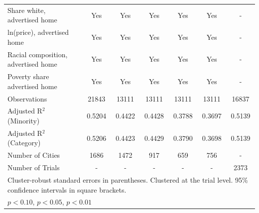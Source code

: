 \begin{table}[htbp]
{\begin{tabular}{l*{6}{c}}
\midrule
Share white, advertised home  & Yes & Yes & Yes & Yes & Yes & - \\
ln(price), advertised home  & Yes & Yes & Yes & Yes & Yes & - \\
Racial composition, advertised home & Yes & Yes & Yes & Yes & Yes & - \\
Poverty share advertised home & Yes & Yes & Yes & Yes & Yes & - \\
Observations & 21843 & 13111 & 13111 & 13111 & 13111 & 16837 \\
Adjusted R$^2$ (Minority) & 0.5204 & 0.4422 & 0.4428 & 0.3788 & 0.3697 & 0.5139 \\
Adjusted R$^2$ (Category) & 0.5206 & 0.4423 & 0.4429 & 0.3790 & 0.3698 & 0.5139 \\
Number of Cities & 1686 & 1472 & 917 & 659 & 756 & - \\
Number of Trials & - & - & - & - & - & 2373 \\
\bottomrule
\multicolumn{7}{l}{\footnotesize Cluster-robust standard errors in parentheses. Clustered at the trial level. 95\% confidence intervals in square brackets.}\\
\multicolumn{7}{l}{\footnotesize \sym{*} \(p<0.10\), \sym{**} \(p<0.05\), \sym{***} \(p<0.01\)}\\
\end{tabular}
}
\end{table}
